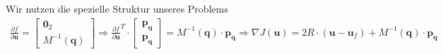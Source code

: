 \documentclass[a4paper, 12pt]{scrartcl}
\begin{document}
Wir nutzen die spezielle Struktur unseres Problems
%
\begin{align*}
    \frac{\partial f}{\partial \bm{u}}
    =
    \begin{bmatrix}
        \bm{0}_2 \\
        M^{-1}(\bm{q})
    \end{bmatrix}
    \Rightarrow
    \frac{\partial f}{\partial \bm{u}}^T \cdot
    \begin{bmatrix}
        \bm{p}_{\bm{q}} \\
        \bm{p}_{\dot{\bm{q}}}
    \end{bmatrix}
    =
    M^{-1}(\bm{q}) \cdot \bm{p}_{\dot{\bm{q}}}
    \Rightarrow
    \nabla J(\bm{u})
    =
    2 R \cdot (\bm{u} - \bm{u}_f) + M^{-1}(\bm{q}) \cdot \bm{p}_{\dot{\bm{q}}}
\end{align*}
 
\end{document}
